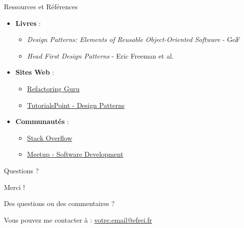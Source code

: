 \documentclass[aspectratio=169]{beamer}
\begin{document}
\begin{frame}{Ressources et Références}
    \begin{itemize}
        \item \textbf{Livres} :
              \begin{itemize}
                  \item \textit{Design Patterns: Elements of Reusable Object-Oriented Software} - GoF
                  \item \textit{Head First Design Patterns} - Eric Freeman et al.
              \end{itemize}
        \item \textbf{Sites Web} :
              \begin{itemize}
                  \item \href{https://refactoring.guru/design-patterns}{Refactoring Guru}
                  \item \href{https://www.tutorialspoint.com/design_pattern/index.htm}{TutorialsPoint - Design Patterns}
              \end{itemize}
        \item \textbf{Communautés} :
              \begin{itemize}
                  \item \href{https://stackoverflow.com}{Stack Overflow}
                  \item \href{https://www.meetup.com/topics/softwaredev/}{Meetup - Software Development}
              \end{itemize}
    \end{itemize}
\end{frame}

\begin{frame}{Questions ?}
    \begin{center}
        {\Huge\calligra Merci !}

        \vspace{1cm}

        \Large{Des questions ou des commentaires ?}

        \vspace{0.5cm}

        \small{Vous pouvez me contacter à : \href{mailto:votre.email@efrei.fr}{votre.email@efrei.fr}}
    \end{center}
\end{frame}
\end{document}
